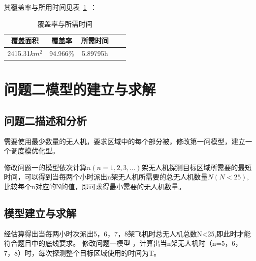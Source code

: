 \documentclass{whutmod}
\begin{document}
	其覆盖率与所用时间见表~\ref{tab111}~：
	\begin{table}[H]
		\caption{覆盖率与所需时间}\label{tab111} \centering
		\begin{tabular}{ccccc}
			\toprule[1.5pt]
			覆盖面积 & 覆盖率 & 所需时间 \\
			\midrule[1pt]
		2415.31$km^{2}$	& 94.966\% &5.89795h\\
			\bottomrule[1.5pt]
		\end{tabular}
	\end{table}
	
	\section{问题二模型的建立与求解}
	\subsection{问题二描述和分析}
	需要使用最少数量的无人机，要求区域中的每个部分被，修改第一问模型，建立一个调度模优化型。

	修改问题一的模型依次计算$n(n=1,2,3,...)$架无人机探测目标区域所需要的最短时间，可以得到当每两个小时派出n架无人机所需要的总无人机数量$N(N<25)$,比较每个n对应的N的值，即可求得最小需要的无人机数量。

	\subsection{模型建立与求解}
	经估算得出当每两小时次派出5，6，7，8架飞机时总无人机总数N<25,即此时才能符合题目中的底线要求。
	修改问题一模型 ，计算出当n架无人机时（n=5，6，7，8）时，每次探测整个目标区域使用的时间为T。

	
	
\end{document}
